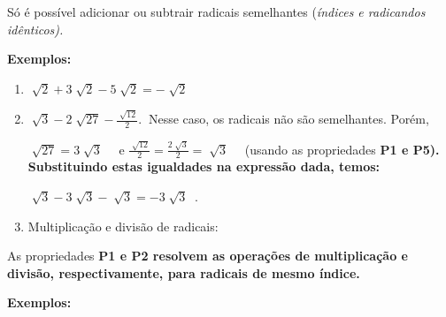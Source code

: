 \documentclass[12pt]{article}
\renewcommand{\_}{\kern-1.5pt\textunderscore\kern-1.5pt}
\begin{document}
\begin{adjustwidth}{0.74in}{0.0in}
Só é possível adicionar ou subtrair radicais semelhantes (\textit{índices e radicandos idênticos). }\par

\end{adjustwidth}

\begin{adjustwidth}{0.74in}{0.0in}
\textbf{Exemplos:}\par

\end{adjustwidth}

\begin{enumerate}
	\item  \( \sqrt[]{2}+3\sqrt[]{2}-5\sqrt[]{2}=-\sqrt[]{2} \) \par

	\item  \( \sqrt[]{3}-2\sqrt[]{27}-\frac{\sqrt[]{12}}{2}.~ \)  Nesse caso, os radicais não são semelhantes. Porém,\par

 \( \sqrt[]{27}=3\sqrt[]{3} \) \ \ e   \( \frac{\sqrt[]{12}}{2}=\frac{2\sqrt[]{3}}{2}=\sqrt[]{3} \) \ \  (usando as propriedades \textbf{P1 e P5). Substituindo estas igualdades na expressão dada, temos:}\par

 \( \sqrt[]{3}-3\sqrt[]{3}-\sqrt[]{3}=-3\sqrt[]{3}~ \) .\par

	\item Multiplicação e divisão de radicais:
\end{enumerate}\par

\begin{adjustwidth}{0.99in}{0.0in}
As propriedades \textbf{P1 e P2 resolvem as operações de multiplicação e divisão, respectivamente, para radicais de mesmo índice. }\par

\end{adjustwidth}

\begin{adjustwidth}{0.79in}{0.0in}
\textbf{Exemplos:}\par

\end{adjustwidth}
\end{document}

